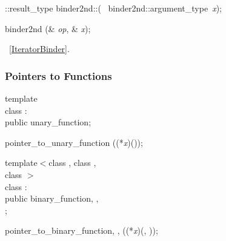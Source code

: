 \begin{multicols}{4}
\newline
\Operation::result_type\newline
binder2nd::(\newline
\phantom{ABC}\const\ binder2nd::argument_type\ \textsl{x});


binder2nd\TP{\Operation}\newline
{}(\const \Operation\& \textsl{op}, \const \T\& \textsl{x});

\seeExample\ \ref{IteratorBinder}.


\subsubsection{Pointers to Functions}

\begin{templdec}
template\\
class  :\\
\phantom{A}public unary_function\TP{\Arg, \Result};\\
\end{templdec}

pointer_to_unary_function\TP{\Arg, \Result}\newline
{}(\Result (*\textsl{x})(\Arg));

\begin{templdec}
template$<$class , class ,\\
\phantom{template\<}class \Result$>$\\
class  :\\
\phantom{A}public binary_function\<, ,\\
\phantom{Apublic binary_function\<}\Result\>;\\
\end{templdec}

pointer_to_binary_function\<, ,\newline
\phantom{pointer_to_binary_function\<}\Result\>\newline
{}(\Result (*\textsl{x})(, ));

 \label{Iterators}


\end{multicols}

